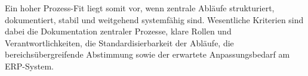Ein hoher Prozess-Fit liegt somit vor, wenn zentrale Abläufe strukturiert, dokumentiert, stabil und weitgehend systemfähig sind. 
Wesentliche Kriterien sind dabei die Dokumentation zentraler Prozesse, klare Rollen und Verantwortlichkeiten, die 
Standardisierbarkeit der Abläufe, die bereichsübergreifende Abstimmung sowie der erwartete Anpassungsbedarf am ERP-System.

